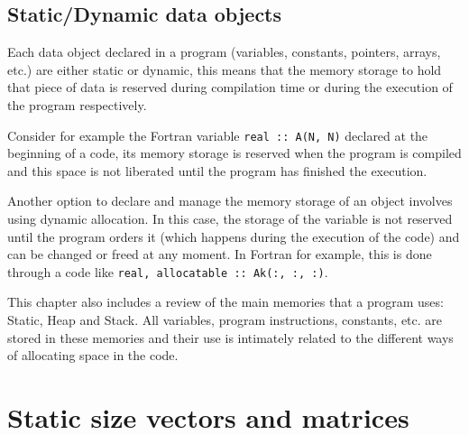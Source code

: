 


    \vspace{-.5cm}
    \subsection*{Static/Dynamic data objects}

Each data object declared in a program (variables, constants, pointers, arrays, etc.) are either static or dynamic, 
this means that the memory storage to hold that piece of data is reserved during compilation time or 
during the execution of the program respectively. 

Consider for example the Fortran variable \texttt{real :: A(N, N)} declared at the beginning of a code, 
its memory storage is reserved when the program is compiled and this space is not liberated 
until the program has finished the execution. 

Another option to declare and manage the memory storage of an object involves using dynamic allocation. 
In this case, the storage of the variable is not reserved until the program orders it (which happens during the execution of the code) and can be changed or freed at any moment. 
In Fortran for example, this is done through a code like \texttt{real, allocatable :: Ak(:, :, :)}.

This chapter also includes a review of the main memories that a program uses: Static, Heap and Stack.
All variables, program instructions, constants, etc. are stored in these memories and their use is intimately related 
to the different ways of allocating space in the code.



\newpage 
\section{Static size vectors and matrices} 


